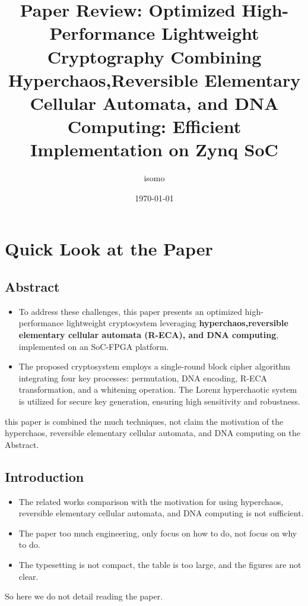 \documentclass[a4paper]{article}
\title{Paper Review: Optimized High-Performance Lightweight Cryptography Combining Hyperchaos,Reversible Elementary Cellular Automata, and DNA Computing: Efficient Implementation on Zynq SoC}
\author{isomo}
\date{\today}
\begin{document}
\maketitle

\section{Quick Look at the Paper}

\subsection{Abstract}

\begin{itemize}
    \item To address these challenges, this paper presents an optimized high-performance lightweight cryptosystem leveraging \textbf{hyperchaos,reversible elementary cellular automata (R-ECA), and DNA computing}, implemented on an SoC-FPGA platform.
    \item The proposed cryptosystem employs a single-round block cipher algorithm integrating four key processes: permutation, DNA encoding, R-ECA transformation, and a whitening operation. The Lorenz hyperchaotic system is utilized for secure key generation, ensuring high sensitivity and robustness.
\end{itemize}

\begin{note}
    this paper is combined the much techniques, not claim the motivation of the hyperchaos, reversible elementary cellular automata, and DNA computing on the Abstract.
\end{note}

\subsection{Introduction}

\begin{note}
    \begin{itemize}
        \item The related works comparison with the motivation for using hyperchaos, reversible elementary cellular automata, and DNA computing is not sufficient.
        \item The paper too much engineering, only focus on how to do, not focus on why to do.
        \item The typesetting is not compact, the table is too large, and the figures are not clear.
    \end{itemize}
    So here we do not detail reading the paper.
\end{note}
\end{document}
